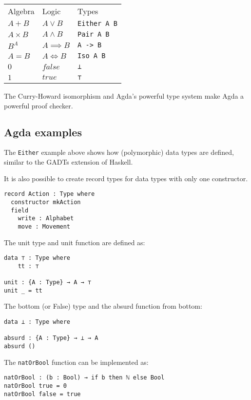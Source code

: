\begin{table}[H]
\begin{tabular}{lll}
Algebra      & Logic                   & Types \\
$A + B$      & $A \vee B$              & \texttt{Either A B} \\
$A \times B$ & $A \wedge B$            & \texttt{Pair A B}\\
$B^A$        & $ A \implies B$         & \texttt{A -> B} \\
$A = B$      & $ A \iff B$             & \texttt{Iso A B}\\
$0$          & $ false $               & \texttt{⊥}\\
$1$          & $ true  $               & \texttt{⊤}
\end{tabular}
\end{table}


The Curry-Howard isomorphism and Agda's powerful type system make Agda a powerful proof checker.


\subsection{Agda examples}
The \texttt{Either} example above shows how (polymorphic) data types are defined, similar to the GADTs \cite{ghc-gadts} extension of Haskell.

It is also possible to create record types for data types with only one constructor.

\begin{verbatim}
record Action : Type where
  constructor mkAction
  field
    write : Alphabet
    move : Movement
\end{verbatim}

The unit type and unit function are defined as:
\begin{verbatim}
data ⊤ : Type where
    tt : ⊤

unit : {A : Type} → A → ⊤
unit _ = tt
\end{verbatim}

The bottom (or False) type and the absurd function from bottom:
\begin{verbatim}
data ⊥ : Type where

absurd : {A : Type} → ⊥ → A
absurd ()
\end{verbatim}

The \texttt{natOrBool} function can be implemented as:
\begin{verbatim}
natOrBool : (b : Bool) → if b then ℕ else Bool
natOrBool true = 0
natOrBool false = true
\end{verbatim}

